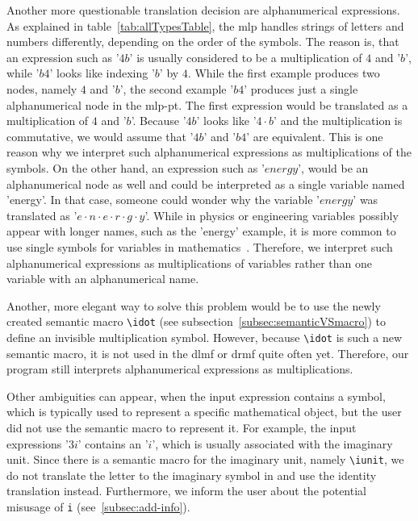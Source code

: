Another more questionable translation decision are alphanumerical expressions. As explained in table~\ref{tab:allTypesTable}, the \gls{mlp} handles strings of letters and numbers differently, depending on the order of the symbols. The reason is, that an expression such as '$4b$' is usually considered to be a multiplication of $4$ and '$b$', while '$b4$' looks like indexing '$b$' by $4$. While the first example produces two nodes, namely $4$ and '$b$', the second example '$b4$' produces just a single alphanumerical node in the \gls{mlp-pt}. The first expression would be translated as a multiplication of $4$ and '$b$'. Because '$4b$' looks like '$4 \cdot b$' and the multiplication is commutative, we would assume that '$4b$' and '$b4$' are equivalent. This is one reason why we interpret such alphanumerical expressions as multiplications of the symbols. On the other hand, an expression such as '$energy$', would be an alphanumerical node as well and could be interpreted as a single variable named 'energy'. In that case, someone could wonder why the variable '$energy$' was translated as '$e \cdot n \cdot e \cdot r \cdot g \cdot y$'. While in physics or engineering variables possibly appear with longer names, such as the 'energy' example, it is more common to use single symbols for variables in mathematics~\cite{Notation:History}. Therefore, we interpret such alphanumerical expressions as multiplications of variables rather than one variable with an alphanumerical name.

Another, more elegant way to solve this problem would be to use the newly created semantic macro \verb|\idot| (see subsection~\ref{subsec:semanticVSmacro}) to define an invisible multiplication symbol. However, because \verb|\idot| is such a new semantic macro, it is not used in the \gls{dlmf} or \gls{drmf} quite often yet. Therefore, our program still interprets alphanumerical expressions as multiplications.

Other ambiguities can appear, when the input expression contains a symbol, which is typically used to represent a specific mathematical object, but the user did not use the semantic macro to represent it. For example, the input expressions '$3i$' contains an '$i$', which is usually associated with the imaginary unit. Since there is a semantic macro for the imaginary unit, namely \verb|\iunit|, we do not translate the letter to the imaginary symbol in \Maple{} and use the identity translation instead. Furthermore, we inform the user about the potential misusage of \verb|i| (see~\ref{subsec:add-info}).

